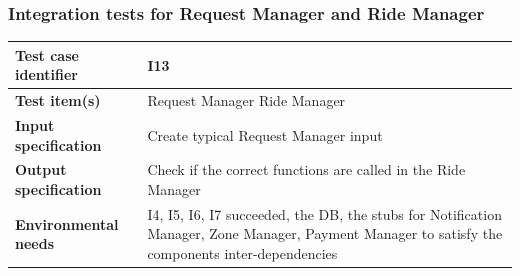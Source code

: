 \documentclass[a4paper,11pt]{report} %
\begin{document}
		\subsubsection{Integration tests for Request Manager and Ride Manager} \label{sec:3.1.10}
			\begin{minipage}{\linewidth}
			\end{minipage}		
		\begin{center}
			\renewcommand{\arraystretch}{1.2}
			\setlength{\tabcolsep}{24pt}
			\begin{tabular}{ l  p{9cm}}\hline
				\textbf{Test case identifier} & I13\\\hline
				\textbf{Test item(s)} & Request Manager \textrightarrow Ride Manager\\\hline
				\textbf{Input specification} & Create typical Request Manager input \\\hline
				\textbf{Output specification} & Check if the correct functions are called in the Ride Manager\\\hline
				\textbf{Environmental needs} & I4, I5, I6, I7 succeeded, the DB, the stubs for Notification Manager, Zone Manager, Payment Manager to satisfy the components inter-dependencies\\\hline
			\end{tabular}
		\end{center}		
		
		\bigskip
\end{document}
